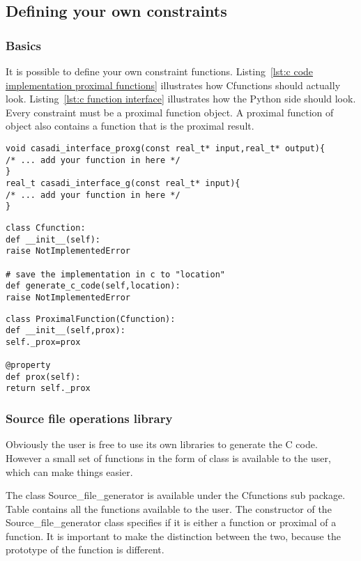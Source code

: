 \subsection{Defining your own constraints}
\subsubsection{Basics}
It is possible to define your own constraint functions. Listing~\ref{lst:c code implementation proximal functions} illustrates how Cfunctions should actually look. Listing~\ref{lst:c function interface} illustrates how the Python side should look. Every constraint must be a proximal function object. A proximal function of object also contains a function that is the proximal result.

\begin{lstlisting}[caption={c code implementation proximal functions},captionpos=b,label={lst:c code implementation proximal functions}]
void casadi_interface_proxg(const real_t* input,real_t* output){
/* ... add your function in here */
}
real_t casadi_interface_g(const real_t* input){
/* ... add your function in here */
}
\end{lstlisting}

\begin{lstlisting}[caption={c function interface},captionpos=b,label={lst:c function interface}]
class Cfunction:
def __init__(self):
raise NotImplementedError

# save the implementation in c to "location"
def generate_c_code(self,location):
raise NotImplementedError
\end{lstlisting}

\begin{lstlisting}[caption={c proximal function interface},captionpos=b,label={lst:c proximal function interface}]
class ProximalFunction(Cfunction):
def __init__(self,prox):
self._prox=prox

@property
def prox(self):
return self._prox
\end{lstlisting}

\subsubsection{Source file operations library}
Obviously the user is free to use its own libraries to generate the C code. However a small set of functions in the form of class is available to the user, which can make things easier.

The class Source\_file\_generator is available under the Cfunctions sub package. Table contains all the functions available to the user. The constructor of the Source\_file\_generator class specifies if it is either a function or proximal of a function. It is important to make the distinction between the two, because the prototype of the function is different. 

